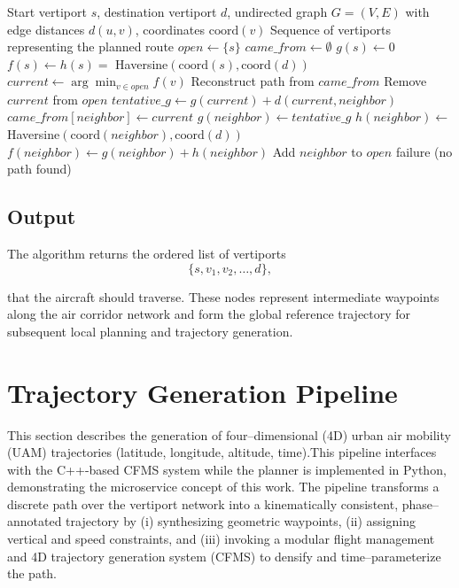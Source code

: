 \begin{algorithm}[H]
\caption{A* Path Planning in Air Corridors}
\label{alg:astar}
\begin{algorithmic}[1]
\Require Start vertiport $s$, destination vertiport $d$, undirected graph $G = (V, E)$ with edge distances $d(u,v)$, coordinates $\text{coord}(v)$
\Ensure Sequence of vertiports representing the planned route
\State $open \gets \{s\}$ 
\State $came\_from \gets \emptyset$
\State $g(s) \gets 0$
\State $f(s) \gets h(s) =$ Haversine$(\text{coord}(s), \text{coord}(d))$
  \State $current \gets \arg\min_{v \in open} f(v)$
    \State \Return Reconstruct path from $came\_from$
  \EndIf
  \State Remove $current$ from $open$
    \State $tentative\_g \gets g(current) + d(current, neighbor)$
      \State $came\_from[neighbor] \gets current$
      \State $g(neighbor) \gets tentative\_g$
      \State $h(neighbor) \gets$ Haversine$(\text{coord}(neighbor), \text{coord}(d))$
      \State $f(neighbor) \gets g(neighbor) + h(neighbor)$
      \State Add $neighbor$ to $open$
    \EndIf
  \EndFor
\EndWhile
\State \Return failure (no path found)
\end{algorithmic}
\end{algorithm}

\subsection*{Output}
The algorithm returns the ordered list of vertiports
\begin{equation}
    \{ s, v_1, v_2, \dots, d \},
\end{equation}

that the aircraft should traverse. These nodes represent intermediate waypoints
along the air corridor network and form the global reference trajectory for
subsequent local planning and trajectory generation.

\section{Trajectory Generation Pipeline}
\label{s_traj_generation}

This section describes the generation of four–dimensional (4D) urban air mobility (UAM) trajectories
(latitude, longitude, altitude, time).This pipeline interfaces with the C++-based CFMS \cite{morscheck2021cfms} system while the planner is implemented in Python, demonstrating the microservice concept of this work. The pipeline transforms a discrete path over the vertiport
network into a kinematically consistent, phase–annotated trajectory by (i) synthesizing geometric
waypoints, (ii) assigning vertical and speed constraints, and (iii) invoking a modular flight
management and 4D trajectory generation system (CFMS) \cite{morscheck2021cfms} to densify and
time–parameterize the path.

